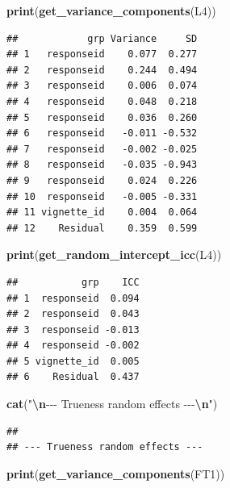 \documentclass[
]{article}
\newenvironment{Shaded}{\begin{snugshade}}{\end{snugshade}}
\newcommand{\FunctionTok}[1]{\textcolor[rgb]{0.13,0.29,0.53}{\textbf{#1}}}
\newcommand{\NormalTok}[1]{#1}
\newcommand{\SpecialCharTok}[1]{\textcolor[rgb]{0.81,0.36,0.00}{\textbf{#1}}}
\newcommand{\StringTok}[1]{\textcolor[rgb]{0.31,0.60,0.02}{#1}}
\begin{document}
\begin{Shaded}
\begin{Highlighting}[]
\FunctionTok{print}\NormalTok{(}\FunctionTok{get\_variance\_components}\NormalTok{(L4))}
\end{Highlighting}
\end{Shaded}

\begin{verbatim}
##            grp Variance     SD
## 1   responseid    0.077  0.277
## 2   responseid    0.244  0.494
## 3   responseid    0.006  0.074
## 4   responseid    0.048  0.218
## 5   responseid    0.036  0.260
## 6   responseid   -0.011 -0.532
## 7   responseid   -0.002 -0.025
## 8   responseid   -0.035 -0.943
## 9   responseid    0.024  0.226
## 10  responseid   -0.005 -0.331
## 11 vignette_id    0.004  0.064
## 12    Residual    0.359  0.599
\end{verbatim}

\begin{Shaded}
\begin{Highlighting}[]
\FunctionTok{print}\NormalTok{(}\FunctionTok{get\_random\_intercept\_icc}\NormalTok{(L4))}
\end{Highlighting}
\end{Shaded}

\begin{verbatim}
##           grp    ICC
## 1  responseid  0.094
## 2  responseid  0.043
## 3  responseid -0.013
## 4  responseid -0.002
## 5 vignette_id  0.005
## 6    Residual  0.437
\end{verbatim}

\begin{Shaded}
\begin{Highlighting}[]
\FunctionTok{cat}\NormalTok{(}\StringTok{"}\SpecialCharTok{\textbackslash{}n}\StringTok{{-}{-}{-} Trueness random effects {-}{-}{-}}\SpecialCharTok{\textbackslash{}n}\StringTok{"}\NormalTok{)}
\end{Highlighting}
\end{Shaded}

\begin{verbatim}
## 
## --- Trueness random effects ---
\end{verbatim}

\begin{Shaded}
\begin{Highlighting}[]
\FunctionTok{print}\NormalTok{(}\FunctionTok{get\_variance\_components}\NormalTok{(FT1))}
\end{Highlighting}
\end{Shaded}
\end{document}
